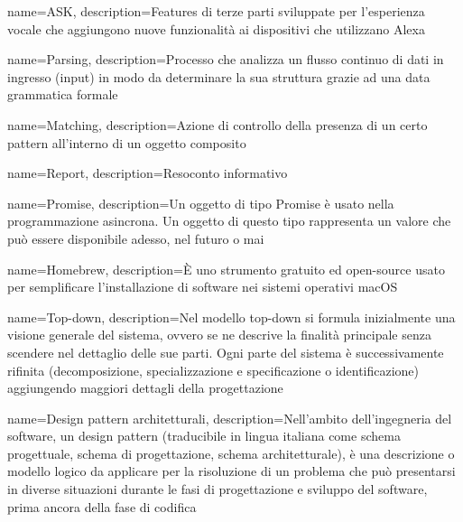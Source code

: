 {
  name=ASK,
  description={Features di terze parti sviluppate per l'esperienza vocale che aggiungono nuove funzionalità ai dispositivi che utilizzano Alexa}
}

{
  name=Parsing,
  description={Processo che analizza un flusso continuo di dati in ingresso (input) in modo da determinare la sua struttura grazie ad una data grammatica formale}
}

{
  name=Matching,
  description={Azione di controllo della presenza di un certo pattern all'interno di un oggetto composito}
}

{
  name=Report,
  description={Resoconto informativo}
}

{
  name=Promise,
  description={Un oggetto di tipo Promise è usato nella programmazione asincrona. Un oggetto di questo tipo rappresenta un valore che può essere disponibile adesso, nel futuro o mai}
}

{
  name=Homebrew,
  description={È uno strumento gratuito ed open-source usato per semplificare l'installazione di software nei sistemi operativi macOS}
}

{
  name=Top-down,
  description={Nel modello top-down si formula inizialmente una visione generale del sistema, ovvero se ne descrive la finalità principale senza scendere nel dettaglio delle sue parti. Ogni parte del sistema è successivamente rifinita (decomposizione, specializzazione e specificazione o identificazione) aggiungendo maggiori dettagli della progettazione}
}

{
  name=Design pattern architetturali,
  description={Nell'ambito dell'ingegneria del software, un design pattern (traducibile in lingua italiana come schema progettuale, schema di progettazione, schema architetturale), è una descrizione o modello logico da applicare per la risoluzione di un problema che può presentarsi in diverse situazioni durante le fasi di progettazione e sviluppo del software, prima ancora della fase di codifica}
}






